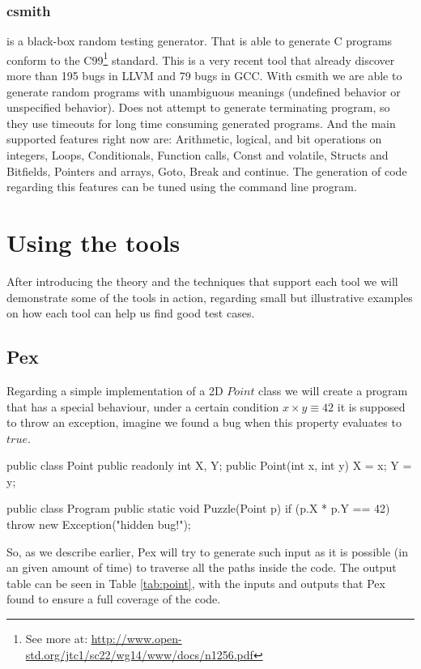 \documentclass[10pt, conference, compsocconf]{IEEEtran}
\begin{document}
\subsubsection{\textbf{csmith}\cite{Yang:2011:FUB:1993316.1993532}} is a black-box random testing generator. That is able to generate C programs
conform to the C99\footnote{See more at: \url{http://www.open-std.org/jtc1/sc22/wg14/www/docs/n1256.pdf}} standard. This is a very recent tool that already discover
more than 195 bugs in LLVM and 79 bugs in GCC. With csmith we are able to generate random programs with unambiguous meanings (undefined behavior or 
unspecified behavior). Does not attempt to generate terminating program, so they use timeouts for long time consuming generated programs.
And the main supported features right now are: Arithmetic, logical, and bit operations on integers, Loops, Conditionals, Function calls, Const and volatile,
Structs and Bitfields, Pointers and arrays, Goto, Break and continue. The generation of code regarding this features can be tuned using the command line program.

\section{Using the tools}
After introducing the theory and the techniques that support each tool we will demonstrate some of the tools in action, regarding small but illustrative examples
on how each tool can help us find good test cases.

\subsection{Pex}
Regarding a simple implementation of a 2D $Point$ class we will create a program that has a special behaviour, under a certain condition
$x \times y \equiv 42$ it is supposed to throw an exception, imagine we found a bug when this property evaluates to $true$.

\begin{code}
public class Point  {
  public readonly int X, Y;
  public Point(int x, int y) { X = x; Y = y; }
}

public class Program {
  public static void Puzzle(Point p) {
    if (p.X * p.Y == 42)
        throw new Exception("hidden bug!");
  }
}
\end{code}

So, as we describe earlier, Pex will try to generate such input as it is possible (in an given amount of time) to traverse all the paths inside the code.
The output table can be seen in Table \ref{tab:point}, with the inputs and outputs that Pex found to ensure a full coverage of the code.
\end{document}
